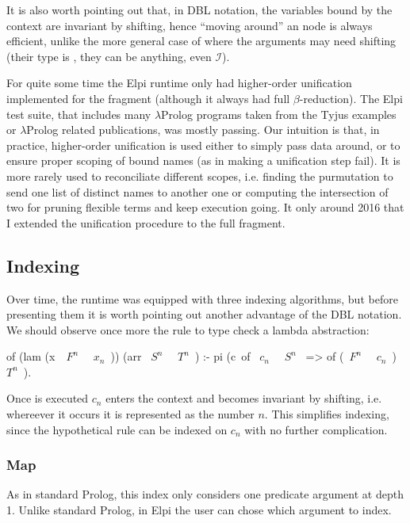 \documentclass[a4paper, 11pt]{book}
\begin{document}
It is also worth pointing out that, in DBL notation, the variables
bound by the context are invariant by shifting, hence ``moving around'' an
 node is always efficient, unlike the more general case
of  where the arguments may need shifting (their type
is , they can be anything, even $\mathcal{I}$).

For quite some time the Elpi runtime only had higher-order unification
implemented for the \thefragment fragment (although it always had full
$\beta$-reduction). The Elpi test suite, that includes many
$\lambda$Prolog programs taken from the Tyjus examples or $\lambda$Prolog
related publications, was mostly passing. Our intuition
is that, in practice, higher-order unification is used either to simply
pass data around, or to ensure proper scoping of bound names (as in making
a unification step fail). It is more rarely used to reconciliate different
scopes, i.e. finding the purmutation to send one list of distinct names to
another one or computing the intersection of two for pruning flexible terms
and keep execution going.
It only around 2016 that I extended the unification procedure
to the full \theotherfragment fragment.


\subsection{Indexing}

Over time, the runtime was equipped with three indexing algorithms, but before
presenting them it is worth pointing out another advantage of the DBL notation.
We should observe once more the rule to type check a lambda abstraction:

\begin{elpicode}
of (lam (x\ ~$F^n$~ ~$x_n$~)) (arr ~$S^n$~ ~$T^n$~) :-
  pi (c\ of ~$c_n$~ ~$S^n$~ => of (~$F^n$~ ~$c_n$~) ~$T^n$~).
\end{elpicode}

\noindent
Once  is executed $c_n$ enters the context and becomes invariant
by shifting, i.e. whereever it occurs it is represented as the number $n$.
This simplifies indexing, since the hypothetical rule 
can be indexed on $c_n$ with no further complication.

\subsubsection{Map}

As in standard Prolog, this index only considers one predicate
argument at depth 1. Unlike standard Prolog, in Elpi the user can
chose which argument to index.
\end{document}
